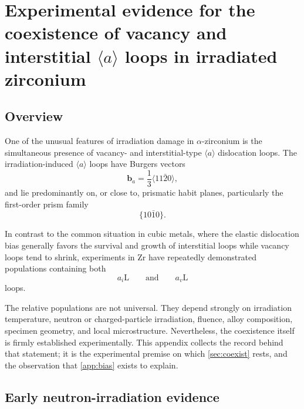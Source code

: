 \documentclass{article}
\renewcommand{\thesection}{\arabic{section}}
\newcommand{\aloop}{\ensuremath{\langle a\rangle}}
\newcommand{\aiL}{a_{i}\mathrm{L}}
\newcommand{\avL}{a_{v}\mathrm{L}}
\newcommand{\bvec}{\bm b}
\begin{document}
\appendix
\renewcommand{\thesection}{\Alph{section}}

\section{Experimental evidence for the coexistence of vacancy and interstitial
\aloop{} loops in irradiated zirconium}
\label{app:coexist-exp}

\subsection{Overview}

One of the unusual features of irradiation damage in $\alpha$-zirconium is the
simultaneous presence of vacancy- and interstitial-type \aloop{} dislocation
loops. The irradiation-induced \aloop{} loops have Burgers vectors
\begin{equation}
    \bvec_a
    =
    \frac{1}{3}\langle 11\bar{2}0\rangle,
\end{equation}
and lie predominantly on, or close to, prismatic habit planes, particularly the
first-order prism family
\begin{equation}
    \{10\bar{1}0\}.
\end{equation}

In contrast to the common situation in cubic metals, where the elastic
dislocation bias generally favors the survival and growth of interstitial loops
while vacancy loops tend to shrink, experiments in Zr have repeatedly
demonstrated populations containing both
\begin{equation}
    \aiL
    \qquad\text{and}\qquad
    \avL
\end{equation}
loops.

The relative populations are not universal. They depend strongly on irradiation
temperature, neutron or charged-particle irradiation, fluence, alloy
composition, specimen geometry, and local microstructure. Nevertheless, the
coexistence itself is firmly established experimentally. This appendix collects
the record behind that statement; it is the experimental premise on which
\cref{sec:coexist} rests, and the observation that \cref{app:bias} exists to
explain.

\subsection{Early neutron-irradiation evidence}
\end{document}
